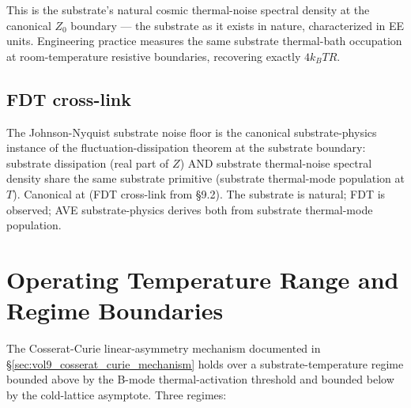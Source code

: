 This is the substrate's natural cosmic thermal-noise spectral density at the canonical $Z_0$ boundary --- the substrate as it exists in nature, characterized in EE units. Engineering practice measures the same substrate thermal-bath occupation at room-temperature resistive boundaries, recovering exactly $4 k_B T R$.

\subsection{FDT cross-link}

The Johnson-Nyquist substrate noise floor is the canonical substrate-physics instance of the fluctuation-dissipation theorem at the substrate boundary: substrate dissipation (real part of $Z$) AND substrate thermal-noise spectral density share the same substrate primitive (substrate thermal-mode population at $T$). Canonical at  (FDT cross-link from  \S 9.2). The substrate is natural; FDT is observed; AVE substrate-physics derives both from substrate thermal-mode population.

\section{Operating Temperature Range and Regime Boundaries}
\label{sec:vol9_temperature_range}

The Cosserat-Curie linear-asymmetry mechanism documented in \S\ref{sec:vol9_cosserat_curie_mechanism} holds over a substrate-temperature regime bounded above by the B-mode thermal-activation threshold and bounded below by the cold-lattice asymptote. Three regimes:

